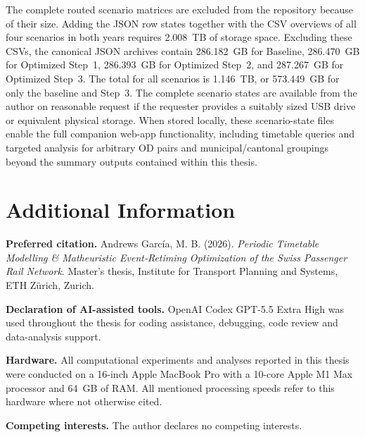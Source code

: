 \documentclass[preprint,12pt]{elsarticle}
\begin{document}
The complete routed scenario matrices are excluded from the repository because of their size. Adding the JSON row states together with the CSV overviews of all four scenarios in both years requires 2.008~TB of storage space. Excluding these CSVs, the canonical JSON archives contain 286.182~GB for Baseline, 286.470~GB for Optimized Step~1, 286.393~GB for Optimized Step~2, and 287.267~GB for Optimized Step~3. The total for all scenarios is 1.146~TB, or 573.449~GB for only the baseline and Step~3. The complete scenario states are available from the author on reasonable request if the requester provides a suitably sized USB drive or equivalent physical storage. When stored locally, these scenario-state files enable the full companion web-app functionality, including timetable queries and targeted analysis for arbitrary OD pairs and municipal/cantonal groupings beyond the summary outputs contained within this thesis.

\section*{Additional Information}

\textbf{Preferred citation.}
Andrews García, M. B. (2026). \textit{Periodic Timetable Modelling \& Matheuristic Event-Retiming Optimization of the Swiss Passenger Rail Network}. Master's thesis, Institute for Transport Planning and Systems, ETH Zürich, Zurich.

\textbf{Declaration of AI-assisted tools.}
OpenAI Codex GPT-5.5 Extra High was used throughout the thesis for coding assistance, debugging, code review and data-analysis support.

\textbf{Hardware.}
All computational experiments and analyses reported in this thesis were conducted on a 16-inch Apple MacBook Pro with a 10-core Apple M1 Max processor and 64~GB of RAM. All mentioned processing speeds refer to this hardware where not otherwise cited.

\textbf{Competing interests.}
The author declares no competing interests.
\end{document}
